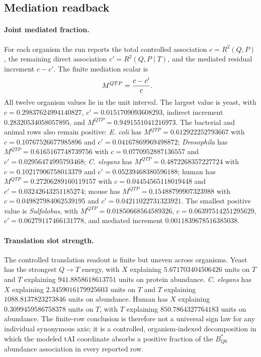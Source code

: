 \subsection{Mediation readback}
\label{subsec:q6-translation-mediated-protein-abundance-readback}

\paragraph{Joint mediated fraction.}
For each organism the run reports the total controlled association $c=R^2(Q,P)$, the remaining direct association $c'=R^2(Q,P\mid T)$, and the mediated residual increment $c-c'$.  The finite mediation scalar is
$$
\begin{aligned}
M^{QTP} &= {c-c' \over c}.
\end{aligned}
$$
All twelve organism values lie in the unit interval.  The largest value is yeast, with $c=0.29837624994140827$, $c'=0.0151709093608293$, indirect increment $0.28320534058057895$, and $M^{QTP}=0.9491551041216973$.  The bacterial and animal rows also remain positive: \emph{E. coli} has $M^{QTP}=0.612922252793667$ with $c=0.10767526677985896$ and $c'=0.04167869969498872$; \emph{Drosophila} has $M^{QTP}=0.6165167748739756$ with $c=0.0770952887136557$ and $c'=0.02956474995793468$; \emph{C. elegans} has $M^{QTP}=0.4872268357227724$ with $c=0.10217906758013379$ and $c'=0.05239468380596188$; human has $M^{QTP}=0.27206289160119157$ with $c=0.04454565118019448$ and $c'=0.03242643251185274$; mouse has $M^{QTP}=0.15488799907323988$ with $c=0.049827984062539195$ and $c'=0.04211022731323921$.  The smallest positive value is \emph{Sulfolobus}, with $M^{QTP}=0.01850668564589326$, $c=0.06397514251295629$, $c'=0.06279117466131778$, and mediated increment $0.0011839678516385038$.

\paragraph{Translation slot strength.}
The controlled translation readout is finite but uneven across organisms.  Yeast has the strongest $Q \to T$ energy, with $X$ explaining $5.671703404506426$ units on $T$ and $T$ explaining $941.8858618613751$ units on protein abundance.  \emph{C. elegans} has $X$ explaining $2.3459016179925603$ units on $T$ and $T$ explaining $1088.8137823273846$ units on abundance.  Human has $X$ explaining $0.3099459586758378$ units on $T$, with $T$ explaining $850.7864327764183$ units on abundance.  The finite-row conclusion is therefore not a universal sign law for any individual synonymous axis; it is a controlled, organism-indexed decomposition in which the modeled tAI coordinate absorbs a positive fraction of the $B^*_{Q6}$ abundance association in every reported row.

